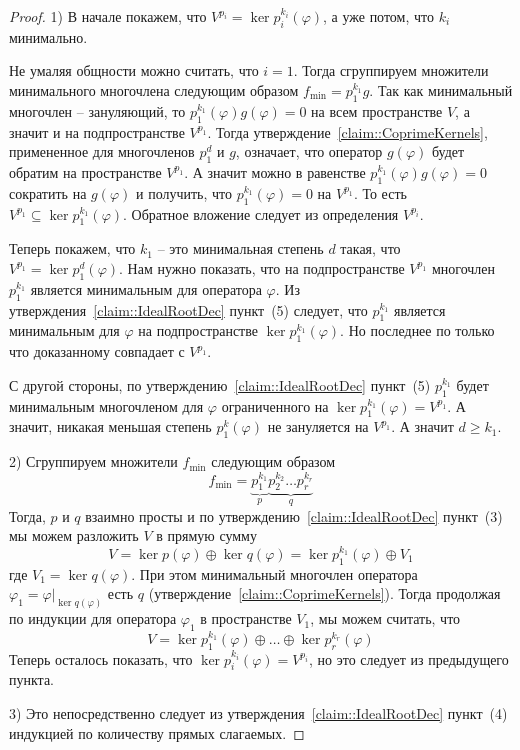 \begin{proof}
1) В начале покажем, что $V^{p_i} = \ker p_i^{k_i}(\varphi)$, а уже потом, что $k_i$ минимально.

Не умаляя общности можно считать, что $i = 1$.
Тогда сгруппируем множители минимального многочлена следующим образом $f_\text{min} = p_1^{k_1} g$.
Так как минимальный многочлен -- зануляющий, то $p_1^{k_1}(\varphi)g(\varphi) = 0$ на всем пространстве $V$, а значит и на подпространстве $V^{p_1}$.
Тогда утверждение~\ref{claim::CoprimeKernels}, примененное для многочленов $p_1^d$ и $g$, означает, что оператор $g(\varphi)$ будет обратим на пространстве $V^{p_1}$.
А значит можно в равенстве $p_1^{k_1}(\varphi)g(\varphi) = 0$  сократить на $g(\varphi)$ и получить, что $p_1^{k_1}(\varphi) = 0$ на $V^{p_1}$.
То есть $V^{p_1}\subseteq \ker p_1^{k_1}(\varphi)$.
Обратное вложение следует из определения $V^{p_i}$.

Теперь покажем, что $k_1$ -- это минимальная степень $d$ такая, что $V^{p_1} = \ker p_1^d(\varphi)$.
Нам нужно показать, что на подпространстве $V^{p_1}$ многочлен $p_1^{k_1}$ является минимальным для оператора $\varphi$.
Из утверждения~\ref{claim::IdealRootDec} пункт~(5) следует, что $p_1^{k_1}$ является минимальным для $\varphi$ на подпространстве $\ker p_1^{k_1}(\varphi)$.
Но последнее по только что доказанному совпадает с $V^{p_1}$.


С другой стороны, по утверждению~\ref{claim::IdealRootDec} пункт~(5) $p_1^{k_1}$ будет минимальным многочленом для $\varphi$ ограниченного на $\ker p_1^{k_1}(\varphi) = V^{p_1}$.
А значит, никакая меньшая степень $p_1^k(\varphi)$ не зануляется на $V^{p_1}$.
А значит $d \geqslant k_1$.

2) Сгруппируем множители $f_\text{min}$ следующим образом
\[
f_\text{min} = \underbrace{p_1^{k_1}}_{p}\underbrace{p_2^{k_2}\ldots p_r^{k_r}}_{q}
\]
Тогда, $p$ и $q$ взаимно просты и по утверждению~\ref{claim::IdealRootDec} пункт~(3) мы можем разложить $V$ в прямую сумму 
\[
V = \ker p(\varphi) \oplus \ker q(\varphi) = \ker p_1^{k_1}(\varphi) \oplus V_1
\]
где $V_1 = \ker q(\varphi)$.
При этом минимальный многочлен оператора $\varphi_1 = \varphi|_{\ker q(\varphi)}$ есть $q$ (утверждение~\ref{claim::CoprimeKernels}).
Тогда продолжая по индукции для оператора $\varphi_1$ в пространстве $V_1$, мы можем считать, что
\[
V = \ker p_1^{k_1}(\varphi)\oplus \ldots \oplus \ker p_r^{k_r}(\varphi)
\]
Теперь осталось показать, что $\ker p_i^{k_i}(\varphi) =  V^{p_i}$, но это следует из предыдущего пункта.

3) Это непосредственно следует из утверждения~\ref{claim::IdealRootDec} пункт~(4) индукцией по количеству прямых слагаемых.
\end{proof}


